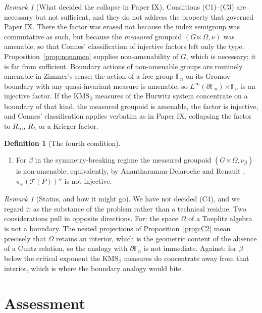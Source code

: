 \documentclass[11pt]{amsart}
\numberwithin{equation}{section}
\theoremstyle{definition}
\newtheorem{definition}[theorem]{Definition}
\theoremstyle{remark}
\newtheorem{remark}[theorem]{Remark}
\newcommand{\F}{\mathbb{F}}
\newcommand{\cT}{\mathcal{T}}
\begin{document}
\begin{remark}[What decided the collapse in Paper IX]\label{rem:omitted}
Conditions (C1)--(C3) are necessary but not sufficient, and they do not address the property
that governed Paper IX. There the factor was erased not because the index semigroup was
commutative as such, but because the \emph{measured} groupoid $(G\ltimes\Omega,\nu)$ was
amenable, so that Connes' classification of injective factors left only the type.
Proposition~\ref{prop:nonamen} supplies non-amenability of $G$, which is necessary; it is far
from sufficient. Boundary actions of non-amenable groups are routinely amenable in Zimmer's
sense: the action of a free group $\F_n$ on its Gromov boundary with any quasi-invariant
measure is amenable, so $L^\infty(\partial\F_n)\rtimes\F_n$ is an injective factor. If the
$\mathrm{KMS}_\beta$ measures of the Hurwitz system concentrate on a boundary of that kind,
the measured groupoid is amenable, the factor is injective, and Connes' classification
applies verbatim as in Paper IX, collapsing the factor to $R_\infty$, $R_\lambda$ or a
Krieger factor.
\end{remark}

\begin{definition}[The fourth condition]\label{def:C4}
\begin{enumerate}
\item[(C4)] For $\beta$ in the symmetry-breaking regime the measured groupoid
$(G\ltimes\Omega,\nu_\beta)$ is non-amenable; equivalently, by Anantharaman-Delaroche and
Renault \cite{ADR}, $\pi_\varphi(\cT(P))''$ is not injective.
\end{enumerate}
\end{definition}

\begin{remark}[Status, and how it might go]\label{rem:status}
We have not decided (C4), and we regard it as the substance of the problem rather than a
technical residue. Two considerations pull in opposite directions. For: the space $\Omega$ of
a Toeplitz algebra is not a boundary. The nested projections of Proposition~\ref{prop:C2}
mean precisely that $\Omega$ retains an interior, which is the geometric content of the
absence of a Cuntz relation, so the analogy with $\partial\F_n$ is not immediate. Against:
for $\beta$ below the critical exponent the $\mathrm{KMS}_\beta$ measures do concentrate away
from that interior, which is where the boundary analogy would bite.
\end{remark}

\section{Assessment}
\end{document}
